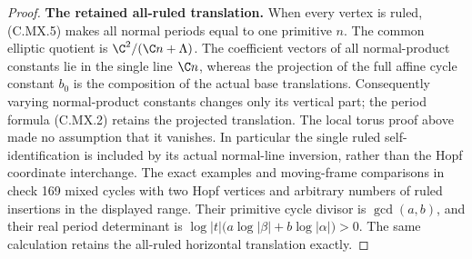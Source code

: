 \begin{proof}
\par\medskip\noindent\textbf{The retained all-ruled translation.}
When every vertex is ruled, (C.MX.5)
makes all normal periods equal to
one primitive $n$. The common
elliptic quotient is
$\C^2/(\C n+\Lambda)$. The coefficient
vectors of all normal-product constants
lie in the single line $\C n$,
whereas the projection of the full
affine cycle constant $b_0$ is the
composition of the actual base
translations. Consequently varying
normal-product constants changes
only its vertical part; the period
formula (C.MX.2) retains the projected
translation. The local torus proof
above made no assumption that it
vanishes. In particular the
single ruled self-identification
is included by its actual
normal-line inversion, rather than
the Hopf coordinate interchange.
The exact examples and moving-frame comparisons in
check 169 mixed cycles with two Hopf vertices and
arbitrary numbers of ruled insertions in the
displayed range. Their primitive cycle divisor is
$\gcd(a,b)$, and their real period determinant is
$\log|t|\bigl(a\log|\beta|+b\log|\alpha|\bigr)>0$.
The same calculation retains the all-ruled
horizontal translation exactly.
\end{proof}
